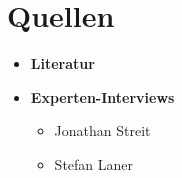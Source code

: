 \section{Quellen}
\nocite{*}

\begin{itemize}
	\item 
    	\textbf{Literatur} \\	
        \printbibliography[heading=none]
	\item 
    	\textbf{Experten-Interviews}\\
		\begin{itemize}
			\item Jonathan Streit
			\item Stefan Laner
		\end{itemize}
\end{itemize}
